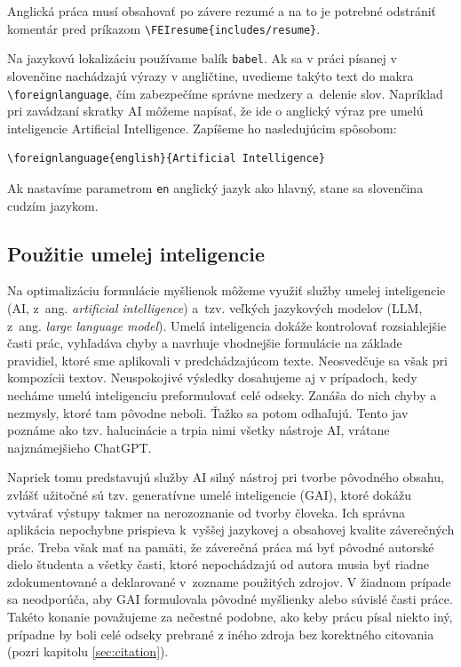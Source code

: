 Anglická práca musí obsahovať po závere rezumé a na to je potrebné odstrániť komentár pred príkazom
\verb|\FEIresume{includes/resume}|.

Na jazykovú lokalizáciu používame balík \verb|babel|.
Ak sa v práci písanej v slovenčine nachádzajú výrazy v angličtine,
uvedieme takýto text do makra \verb|\foreignlanguage|, čím zabezpečíme správne medzery a~delenie slov.
Napríklad pri zavádzaní skratky AI môžeme napísať, že ide o anglický výraz pre umelú inteligencie \foreignlanguage{english}{Artificial Intelligence}.
Zapíšeme ho nasledujúcim spôsobom:
\begin{verbatim}
\foreignlanguage{english}{Artificial Intelligence}
\end{verbatim}

Ak nastavíme parametrom \verb|en| anglický jazyk ako hlavný, stane sa slovenčina cudzím jazykom.

\subsection{Použitie umelej inteligencie}\label{sec:utilizingAI}
Na optimalizáciu formulácie myšlienok môžeme využiť služby
umelej inteligencie (AI, z~ang. \emph{\foreignlanguage{english}{artificial intelligence}}) a~tzv. veľkých jazykových modelov (LLM, z~ang. \emph{\foreignlanguage{english}{large language model}}).
Umelá inteligencia dokáže kontrolovať rozsiahlejšie časti prác,
vyhľadáva chyby a navrhuje vhodnejšie
formulácie na základe pravidiel,
ktoré sme aplikovali v predchádzajúcom texte.
Neosvedčuje sa však pri kompozícii textov.
Neuspokojivé výsledky dosahujeme aj v prípadoch,
kedy necháme umelú inteligenciu preformulovať celé odseky.
Zanáša do nich chyby a nezmysly, ktoré tam pôvodne neboli.
Ťažko sa potom odhaľujú.
Tento jav poznáme ako tzv.
halucinácie a trpia nimi všetky nástroje AI,
vrátane najznámejšieho ChatGPT.

Napriek tomu predstavujú služby AI silný nástroj pri tvorbe pôvodného obsahu, zvlášť užitočné sú tzv. generatívne umelé inteligencie (GAI),
ktoré dokážu vytvárať výstupy takmer na nerozoznanie od tvorby človeka.
Ich správna aplikácia nepochybne prispieva k~vyššej jazykovej a obsahovej kvalite záverečných prác.
Treba však mať na pamäti, že záverečná práca má byť
pôvodné autorské dielo študenta a všetky časti,
ktoré nepochádzajú od autora musia byť riadne
zdokumentované a deklarované v~zozname použitých zdrojov.
V žiadnom prípade sa neodporúča, aby
GAI formulovala pôvodné myšlienky
alebo súvislé časti práce.
Takéto konanie považujeme za nečestné podobne,
ako keby prácu písal niekto iný,
prípadne by boli celé odseky prebrané z iného zdroja bez korektného citovania (pozri kapitolu \ref{sec:citation}).

